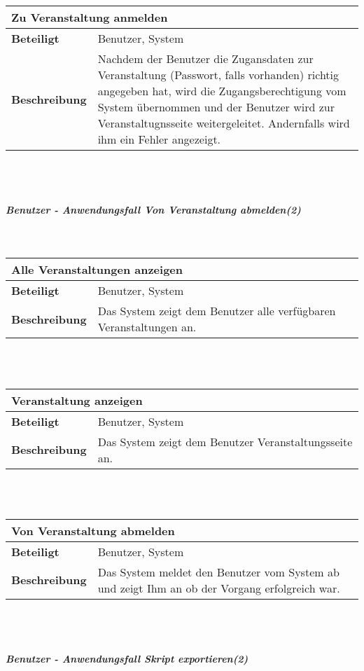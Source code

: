 \documentclass[12pt,a4paper]{article}
\begin{document}
\begin{tabular}{l p{10cm}}
\multicolumn{2}{l}{\textbf{Zu Veranstaltung anmelden}} \\ \hline
\textbf{Beteiligt} & Benutzer, System \\ \hline 
\textbf{Beschreibung} & Nachdem der Benutzer die Zugansdaten zur Veranstaltung (Passwort, falls vorhanden) richtig angegeben hat, wird die Zugangsberechtigung vom System übernommen und der Benutzer wird zur Veranstaltugnsseite weitergeleitet. Andernfalls wird ihm ein Fehler angezeigt.\\ 
\hline 
\end{tabular}\\\\
\subparagraph{Benutzer - Anwendungsfall \glqq Von Veranstaltung abmelden\grqq (2)}\mbox{}\\

\begin{tabular}{l p{10cm}}
\multicolumn{2}{l}{\textbf{Alle Veranstaltungen anzeigen}} \\ \hline
\textbf{Beteiligt} & Benutzer, System \\ \hline 
\textbf{Beschreibung} & Das System zeigt dem Benutzer alle verfügbaren Veranstaltungen an.\\ 
\hline 
\end{tabular}\\\\

\begin{tabular}{l p{10cm}}
\multicolumn{2}{l}{\textbf{Veranstaltung anzeigen}} \\ \hline
\textbf{Beteiligt} & Benutzer, System \\ \hline 
\textbf{Beschreibung} & Das System zeigt dem Benutzer  Veranstaltungsseite an.\\ 
\hline 
\end{tabular}\\\\

\begin{tabular}{l p{10cm}}
\multicolumn{2}{l}{\textbf{Von Veranstaltung abmelden}} \\ \hline
\textbf{Beteiligt} & Benutzer, System \\ \hline 
\textbf{Beschreibung} & Das System meldet den Benutzer vom System ab und zeigt Ihm an ob der Vorgang erfolgreich war.\\ 
\hline 
\end{tabular}\\\\
\subparagraph{Benutzer - Anwendungsfall \glqq Skript exportieren\grqq (2)}\mbox{}\\
\end{document}
